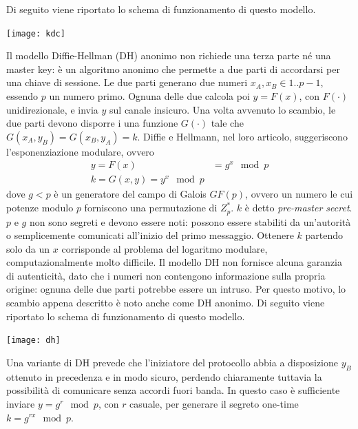 \documentclass[answers, a4paper, 11pt]{exam}
\begin{document}
\begin{questions}
\begin{parts}
\begin{solution}
Di seguito viene riportato lo schema di funzionamento di questo modello.

\texttt{[image: kdc]}

Il modello Diffie-Hellman (DH) anonimo non richiede una terza parte né una master key: è un algoritmo anonimo che permette a due parti di accordarsi per una chiave di sessione.
Le due parti generano due numeri $x_A, x_B \in 1..p-1$, essendo $p$ un numero primo.
Ognuna delle due calcola poi $y = F(x)$, con $F(\cdot)$ unidirezionale, e invia $y$ sul canale insicuro.
Una volta avvenuto lo scambio, le due parti devono disporre i una funzione $G(\cdot)$ tale che $G(x_A, y_B) = G(x_B, y_A) = k$.
Diffie e Hellmann, nel loro articolo, suggeriscono l'esponenziazione modulare, ovvero
\begin{equation}
\begin{array}{ll}
y = F(x) &= g^x \mod p \\
k = G(x, y) = y^x \mod p
\end{array}
\end{equation}
dove $g < p$ è un generatore del campo di Galois $GF(p)$, ovvero un numero le cui potenze modulo $p$ forniscono una permutazione di $Z^*_p$.
$k$ è detto \textit{pre-master secret}.
$p$ e $g$ non sono segreti e devono essere noti: possono essere stabiliti da un'autorità o semplicemente comunicati all'inizio del primo messaggio.
Ottenere $k$ partendo solo da un $x$ corrisponde al problema del logaritmo modulare, computazionalmente molto difficile.
Il modello DH non fornisce alcuna garanzia di autenticità, dato che i numeri non contengono informazione sulla propria origine: ognuna delle due parti potrebbe essere un intruso.
Per questo motivo, lo scambio appena descritto è noto anche come DH anonimo.
Di seguito viene riportato lo schema di funzionamento di questo modello.

\texttt{[image: dh]}

Una variante di DH prevede che l'iniziatore del protocollo abbia a disposizione $y_B$ ottenuto in precedenza e in modo sicuro, perdendo chiaramente tuttavia la possibilità di comunicare senza accordi fuori banda.
In questo caso è sufficiente inviare $y = g^r \mod p$, con $r$ casuale, per generare il segreto one-time $k = g^{rx} \mod p$.
\end{solution}

\end{parts}
\end{questions}
\end{document}

